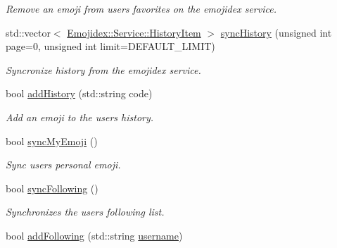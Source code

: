 \begin{DoxyCompactItemize}
\begin{DoxyCompactList}\small\item\em Remove an emoji from users favorites on the emojidex service. \end{DoxyCompactList}\item 
std\+::vector$<$ \hyperlink{classEmojidex_1_1Service_1_1HistoryItem}{Emojidex\+::\+Service\+::\+History\+Item} $>$ \hyperlink{classEmojidex_1_1Service_1_1User_ae26cdfd2fbd24777a167709a615590d1}{sync\+History} (unsigned int page=0, unsigned int limit=D\+E\+F\+A\+U\+L\+T\+\_\+\+L\+I\+M\+IT)
\begin{DoxyCompactList}\small\item\em Syncronize history from the emojidex service. \end{DoxyCompactList}\item 
bool \hyperlink{classEmojidex_1_1Service_1_1User_a5bf74092c95f3b6aca6a5f8dee857879}{add\+History} (std\+::string code)\hypertarget{classEmojidex_1_1Service_1_1User_a5bf74092c95f3b6aca6a5f8dee857879}{}\label{classEmojidex_1_1Service_1_1User_a5bf74092c95f3b6aca6a5f8dee857879}

\begin{DoxyCompactList}\small\item\em Add an emoji to the users history. \end{DoxyCompactList}\item 
bool \hyperlink{classEmojidex_1_1Service_1_1User_acef94239cf65b7d8b707b688a8f0a4c9}{sync\+My\+Emoji} ()
\begin{DoxyCompactList}\small\item\em Sync users personal emoji. \end{DoxyCompactList}\item 
bool \hyperlink{classEmojidex_1_1Service_1_1User_a5d3d73e8788572961694cab846f5708a}{sync\+Following} ()\hypertarget{classEmojidex_1_1Service_1_1User_a5d3d73e8788572961694cab846f5708a}{}\label{classEmojidex_1_1Service_1_1User_a5d3d73e8788572961694cab846f5708a}

\begin{DoxyCompactList}\small\item\em Synchronizes the users following list. \end{DoxyCompactList}\item 
bool \hyperlink{classEmojidex_1_1Service_1_1User_ad0e6e27ef16bc37e1839d2deda9f8744}{add\+Following} (std\+::string \hyperlink{classEmojidex_1_1Service_1_1User_a5bb9d033735aa9f82fa666f811f48743}{username})\hypertarget{classEmojidex_1_1Service_1_1User_ad0e6e27ef16bc37e1839d2deda9f8744}{}\label{classEmojidex_1_1Service_1_1User_ad0e6e27ef16bc37e1839d2deda9f8744}


\end{DoxyCompactItemize}
